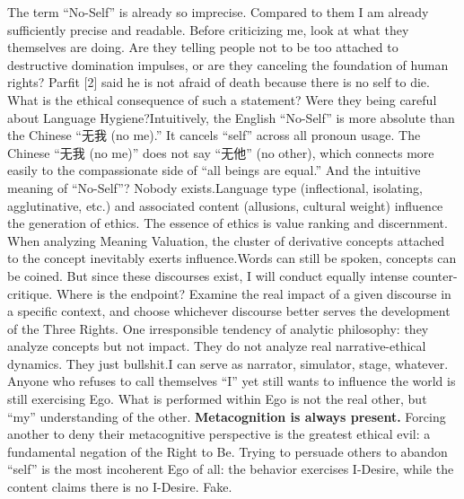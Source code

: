 \documentclass[11pt]{article}
\renewcommand{\\}[1][\mynewlineskip]{\oldnewline[#1]}
\begin{document}
The term ``No-Self'' is already so imprecise. Compared to them I am already sufficiently precise and readable. Before criticizing me, look at what they themselves are doing. Are they telling people not to be too attached to destructive domination impulses, or are they canceling the foundation of human rights? Parfit [2] said he is not afraid of death because there is no self to die. What is the ethical consequence of such a statement? Were they being careful about Language Hygiene?\\
Intuitively, the English ``No-Self'' is more absolute than the Chinese ``无我 (no me).'' It cancels ``self'' across all pronoun usage. The Chinese ``无我 (no me)'' does not say ``无他'' (no other), which connects more easily to the compassionate side of ``all beings are equal.'' And the intuitive meaning of ``No-Self''? Nobody exists.\\
Language type (inflectional, isolating, agglutinative, etc.) and associated content (allusions, cultural weight) influence the generation of ethics. The essence of ethics is value ranking and discernment. When analyzing Meaning Valuation, the cluster of derivative concepts attached to the concept inevitably exerts influence.\\
Words can still be spoken, concepts can be coined. But since these discourses exist, I will conduct equally intense counter-critique. Where is the endpoint? Examine the real impact of a given discourse in a specific context, and choose whichever discourse better serves the development of the Three Rights. One irresponsible tendency of analytic philosophy: they analyze concepts but not impact. They do not analyze real narrative-ethical dynamics. They just bullshit.\\
I can serve as narrator, simulator, stage, whatever. Anyone who refuses to call themselves ``I'' yet still wants to influence the world is still exercising Ego. What is performed within Ego is not the real other, but ``my'' understanding of the other. \textbf{Metacognition is always present.} Forcing another to deny their metacognitive perspective is the greatest ethical evil: a fundamental negation of the Right to Be. Trying to persuade others to abandon ``self'' is the most incoherent Ego of all: the behavior exercises I-Desire, while the content claims there is no I-Desire. Fake.
\end{document}
